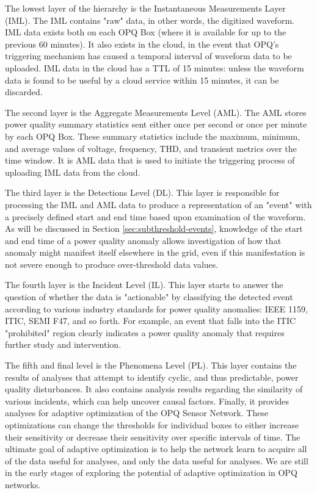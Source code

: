 The lowest layer of the hierarchy is the Instantaneous Measurements Layer (IML). The IML contains "raw" data, in other words, the digitized waveform.  IML data exists both on each OPQ Box (where it is available for up to the previous 60 minutes). It also exists in the cloud, in the event that OPQ's triggering mechanism has caused a temporal interval of waveform data to be uploaded. IML data in the cloud has a TTL of 15 minutes: unless the waveform data is found to be useful by a cloud service within 15 minutes, it can be discarded.

The second layer is the Aggregate Measurements Level (AML). The AML stores power quality summary statistics sent either once per second or once per minute by each OPQ Box. These summary statistics include the maximum, minimum, and average values of voltage, frequency, THD, and transient metrics over the time window. It is AML data that is used to initiate the triggering process of uploading IML data from the cloud.

The third layer is the Detections Level (DL). This layer is responsible for processing the IML and AML data to produce a representation of an "event" with a precisely defined start and end time based upon examination of the waveform.  As will be discussed in Section \ref{sec:subthreshold-events}, knowledge of the start and end time of a power quality anomaly allows investigation of how that anomaly might manifest itself elsewhere in the grid, even if this manifestation is not severe enough to produce over-threshold data values.

The fourth layer is the Incident Level (IL).  This layer starts to answer the question of whether the data is "actionable" by classifying the detected event according to various industry standards for power quality anomalies: IEEE 1159, ITIC, SEMI F47, and so forth.  For example, an event that falls into the ITIC "prohibited" region clearly indicates a power quality anomaly that requires further study and intervention.

The fifth and final level is the Phenomena Level (PL). This layer contains the results of analyses that attempt to identify cyclic, and thus predictable, power quality disturbances. It also contains analysis results regarding the similarity of various incidents, which can help uncover causal factors.  Finally, it provides analyses for adaptive optimization of the OPQ Sensor Network. These optimizations can change the thresholds for individual boxes to either increase their sensitivity or decrease their sensitivity over specific intervals of time. The ultimate goal of adaptive optimization is to help the network learn to acquire all of the data useful for analyses, and only the data useful for analyses.  We are still in the early stages of exploring the potential of adaptive optimization in OPQ networks.

